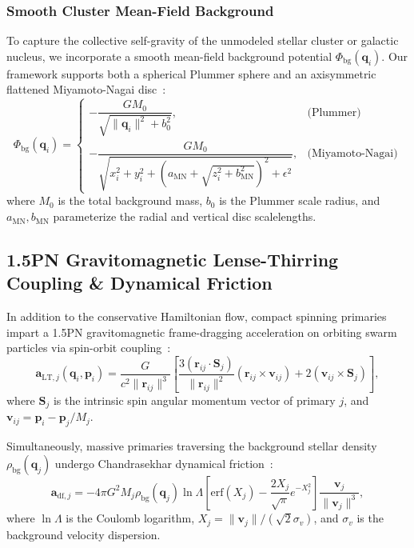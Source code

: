 \documentclass[preprint,12pt,3p]{elsarticle}
\begin{document}
\subsubsection{Smooth Cluster Mean-Field Background}
To capture the collective self-gravity of the unmodeled stellar cluster or galactic nucleus, we incorporate a smooth mean-field background potential $\Phi_{\mathrm{bg}}(\bm{q}_i)$. Our framework supports both a spherical Plummer sphere and an axisymmetric flattened Miyamoto-Nagai disc~\cite{binney2008galactic}:
\begin{equation}
\Phi_{\mathrm{bg}}(\bm{q}_i) = 
\begin{cases}
-\dfrac{G M_0}{\sqrt{\|\bm{q}_i\|^2 + b_0^2}}, & \text{(Plummer)} \\[10pt]
-\dfrac{G M_0}{\sqrt{x_i^2 + y_i^2 + \left(a_{\mathrm{MN}} + \sqrt{z_i^2 + b_{\mathrm{MN}}^2}\right)^2 + \epsilon^2}}, & \text{(Miyamoto-Nagai)}
\end{cases}
\label{eq:background_potential}
\end{equation}
where $M_0$ is the total background mass, $b_0$ is the Plummer scale radius, and $a_{\mathrm{MN}}, b_{\mathrm{MN}}$ parameterize the radial and vertical disc scalelengths.

\subsection{1.5PN Gravitomagnetic Lense-Thirring Coupling \& Dynamical Friction}
In addition to the conservative Hamiltonian flow, compact spinning primaries impart a 1.5PN gravitomagnetic frame-dragging acceleration on orbiting swarm particles via spin-orbit coupling~\cite{barker1975gravitational}:
\begin{equation}
\bm{a}_{\mathrm{LT}, j}(\bm{q}_i, \bm{p}_i) = \frac{G}{c^2 \|\bm{r}_{ij}\|^3} \left[ \frac{3 (\bm{r}_{ij} \cdot \bm{S}_j)}{\|\bm{r}_{ij}\|^2} (\bm{r}_{ij} \times \bm{v}_{ij}) + 2 (\bm{v}_{ij} \times \bm{S}_j) \right],
\label{eq:lense_thirring}
\end{equation}
where $\bm{S}_j$ is the intrinsic spin angular momentum vector of primary $j$, and $\bm{v}_{ij} = \bm{p}_i - \bm{p}_j / M_j$.

Simultaneously, massive primaries traversing the background stellar density $\rho_{\mathrm{bg}}(\bm{q}_j)$ undergo Chandrasekhar dynamical friction~\cite{chandrasekhar1943dynamical}:
\begin{equation}
\bm{a}_{\mathrm{df}, j} = -4\pi G^2 M_j \rho_{\mathrm{bg}}(\bm{q}_j) \ln\Lambda \left[ \mathrm{erf}(X_j) - \frac{2 X_j}{\sqrt{\pi}} e^{-X_j^2} \right] \frac{\bm{v}_j}{\|\bm{v}_j\|^3},
\label{eq:dynamical_friction}
\end{equation}
where $\ln\Lambda$ is the Coulomb logarithm, $X_j = \|\bm{v}_j\| / (\sqrt{2}\sigma_v)$, and $\sigma_v$ is the background velocity dispersion.
\end{document}
